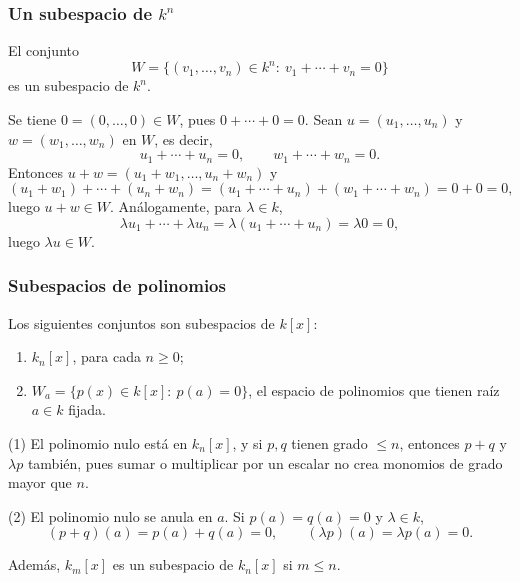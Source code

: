 \begin{frame}
    \frametitle{Un subespacio de $k^n$}

    \begin{example}
        El conjunto
        \[
            W=\{(v_1,\ldots,v_n)\in k^n:\ v_1+\cdots+v_n=0\}
        \]
        es un subespacio de $k^n$.
    \end{example}

    \medskip

    Se tiene $0=(0,\ldots,0)\in W$, pues $0+\cdots+0=0$.
    Sean $u=(u_1,\ldots,u_n)$ y $w=(w_1,\ldots,w_n)$ en $W$, es decir,
    \[
        u_1+\cdots+u_n=0,
        \qquad
        w_1+\cdots+w_n=0.
    \]
    Entonces $u+w=(u_1+w_1,\ldots,u_n+w_n)$ y
    \[
        (u_1+w_1)+\cdots+(u_n+w_n)
        =(u_1+\cdots+u_n)+(w_1+\cdots+w_n)=0+0=0,
    \]
    luego $u+w\in W$. Análogamente, para $\lambda\in k$,
    \[
        \lambda u_1+\cdots+\lambda u_n=\lambda(u_1+\cdots+u_n)=\lambda0=0,
    \]
    luego $\lambda u\in W$.
\end{frame}

\begin{frame}
    \frametitle{Subespacios de polinomios}

    \begin{example}
        Los siguientes conjuntos son subespacios de $k[x]$:
        \begin{enumerate}
            \item $k_n[x]$, para cada $n\geq0$;
            \item $W_a=\{p(x)\in k[x]:\ p(a)=0\}$, el espacio de polinomios que tienen raíz $a\in k$ fijada.
        \end{enumerate}
    \end{example}

    \medskip

    (1) El polinomio nulo está en $k_n[x]$, y si $p,q$ tienen grado
    $\leq n$, entonces $p+q$ y $\lambda p$ también, pues sumar o multiplicar
    por un escalar no crea monomios de grado mayor que $n$.

    \medskip

    (2) El polinomio nulo se anula en $a$. Si $p(a)=q(a)=0$ y $\lambda\in k$,
    \[
        (p+q)(a)=p(a)+q(a)=0,
        \qquad
        (\lambda p)(a)=\lambda p(a)=0.
    \]

    \medskip

    Además, $k_m[x]$ es un subespacio de $k_n[x]$ si $m\leq n$.
\end{frame}

